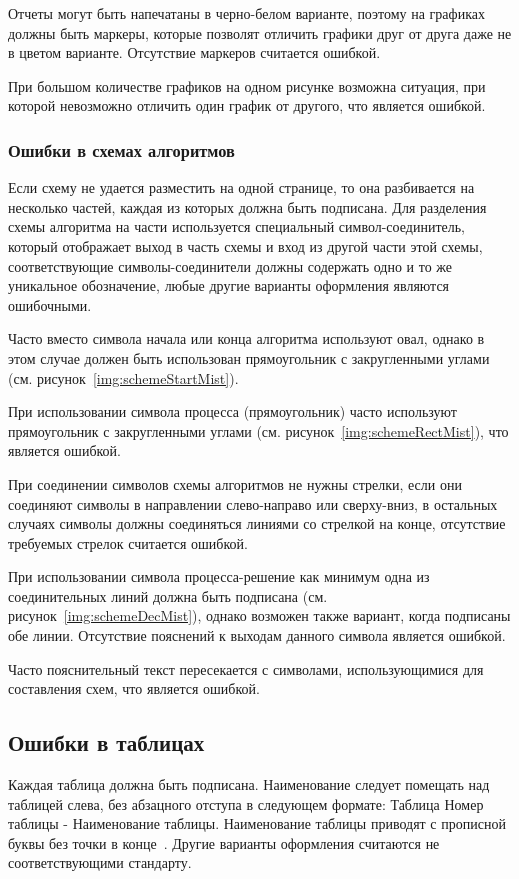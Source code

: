 Отчеты могут быть напечатаны в черно-белом варианте, поэтому на графиках должны быть маркеры, которые позволят отличить графики друг от друга даже не в цветом варианте. Отсутствие маркеров считается ошибкой.

При большом количестве графиков на одном рисунке возможна ситуация, при которой невозможно отличить один график от другого, что является ошибкой.

\subsubsection{Ошибки в схемах алгоритмов}
Если схему не удается разместить на одной странице, то она разбивается на несколько частей, каждая из которых должна быть подписана. Для разделения схемы алгоритма на части используется специальный символ-соединитель, который отображает выход в часть схемы и вход из другой части этой схемы, соответствующие символы-соединители должны содержать одно и то же уникальное обозначение, любые другие варианты оформления являются ошибочными.

Часто вместо символа начала или конца алгоритма используют овал, однако в этом случае должен быть использован прямоугольник с закругленными углами (см. рисунок~\ref{img:schemeStartMist}).

При использовании символа процесса (прямоугольник) часто используют прямоугольник с закругленными углами (см. рисунок~\ref{img:schemeRectMist}), что является ошибкой.

При соединении символов схемы алгоритмов не нужны стрелки, если они соединяют символы в направлении слево-направо или сверху-вниз, в остальных случаях символы должны соединяться линиями со стрелкой на конце, отсутствие требуемых стрелок считается ошибкой.

При использовании символа процесса-решение как минимум одна из соединительных линий должна быть подписана (см. рисунок~\ref{img:schemeDecMist}), однако возможен также вариант, когда подписаны обе линии. Отсутствие пояснений к выходам данного символа является ошибкой.

Часто пояснительный текст пересекается с символами, использующимися для составления схем, что является ошибкой.

\subsection{Ошибки в таблицах}
Каждая таблица должна быть подписана. Наименование следует помещать над таблицей слева, без абзацного отступа в следующем формате: Таблица Номер таблицы - Наименование таблицы. Наименование таблицы приводят с прописной буквы без точки в конце~\cite{GOST732}. Другие варианты оформления считаются не соответствующими стандарту.


